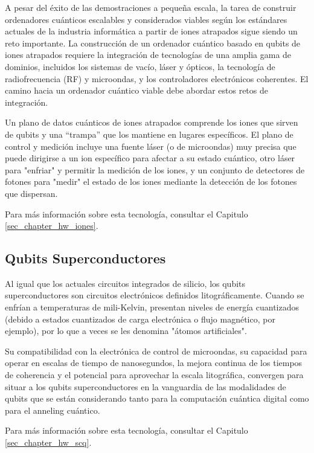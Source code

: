 A pesar del éxito de las demostraciones a pequeña escala, la tarea de construir ordenadores cuánticos escalables y considerados viables según los estándares actuales de la industria informática a partir de iones atrapados sigue siendo un reto importante.  La construcción de un ordenador cuántico basado en qubits de iones atrapados requiere la integración de tecnologías de una amplia gama de dominios, incluidos los sistemas de vacío, láser y ópticos, la tecnología de radiofrecuencia (RF) y microondas, y los controladores electrónicos coherentes. El camino hacia un ordenador cuántico viable debe abordar estos retos de integración.

Un plano de datos cuánticos de iones atrapados comprende los iones que sirven de qubits y una ``trampa'' que los mantiene en lugares específicos. El plano de control y medición incluye una fuente láser (o de microondas) muy precisa que puede dirigirse a un ion específico para afectar a su estado cuántico, otro láser para "enfriar" y permitir la medición de los iones, y un conjunto de detectores de fotones para "medir" el estado de los iones mediante la detección de los fotones que dispersan.

Para más información sobre esta tecnología, consultar el Capitulo \ref{sec_chapter_hw_iones}.

	\subsection{Qubits Superconductores}

Al igual que los actuales circuitos integrados de silicio, los qubits superconductores son circuitos electrónicos definidos litográficamente. Cuando se enfrían a temperaturas de mili-Kelvin, presentan niveles de energía cuantizados (debido a estados cuantizados de carga electrónica o flujo magnético, por ejemplo), por lo que a veces se les denomina "átomos artificiales". 

Su compatibilidad con la electrónica de control de microondas, su capacidad para operar en escalas de tiempo de nanosegundos, la mejora continua de los tiempos de coherencia y el potencial para aprovechar la escala litográfica, convergen para situar a los qubits superconductores en la vanguardia de las modalidades de qubits que se están considerando tanto para la computación cuántica digital como para el anneling cuántico. 

Para más información sobre esta tecnología, consultar el Capitulo \ref{sec_chapter_hw_scq}.

